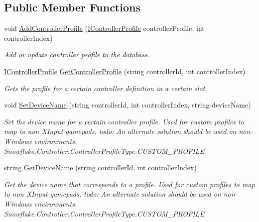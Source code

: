 \subsection*{Public Member Functions}
\begin{DoxyCompactItemize}
\item 
void \hyperlink{interface_snowflake_1_1_controller_1_1_i_controller_profile_database_ac468d872335c4cdbedaffa5e942654ee}{Add\+Controller\+Profile} (\hyperlink{interface_snowflake_1_1_controller_1_1_i_controller_profile}{I\+Controller\+Profile} controller\+Profile, int controller\+Index)
\begin{DoxyCompactList}\small\item\em Add or update controller profile to the database. \end{DoxyCompactList}\item 
\hyperlink{interface_snowflake_1_1_controller_1_1_i_controller_profile}{I\+Controller\+Profile} \hyperlink{interface_snowflake_1_1_controller_1_1_i_controller_profile_database_a1e6de30f211c2de303f9c5944ce01969}{Get\+Controller\+Profile} (string controller\+Id, int controller\+Index)
\begin{DoxyCompactList}\small\item\em Gets the profile for a certain controller definition in a certain slot. \end{DoxyCompactList}\item 
void \hyperlink{interface_snowflake_1_1_controller_1_1_i_controller_profile_database_a00da034510f729461b53d7bce4a1bd4e}{Set\+Device\+Name} (string controller\+Id, int controller\+Index, string device\+Name)
\begin{DoxyCompactList}\small\item\em Set the device name for a certain controller profile. Used for custom profiles to map to non X\+Input gamepads. todo\+: An alternate solution should be used on non-\/\+Windows environments. Snowflake.\+Controller.\+Controller\+Profile\+Type.\+C\+U\+S\+T\+O\+M\+\_\+\+P\+R\+O\+F\+I\+L\+E \end{DoxyCompactList}\item 
string \hyperlink{interface_snowflake_1_1_controller_1_1_i_controller_profile_database_abe919ad0989f8404b347ae1baa1119f3}{Get\+Device\+Name} (string controller\+Id, int controller\+Index)
\begin{DoxyCompactList}\small\item\em Get the device name that corresponds to a profile. Used for custom profiles to map to non X\+Input gamepads. todo\+: An alternate solution should be used on non-\/\+Windows environments. Snowflake.\+Controller.\+Controller\+Profile\+Type.\+C\+U\+S\+T\+O\+M\+\_\+\+P\+R\+O\+F\+I\+L\+E \end{DoxyCompactList}\item 

\end{DoxyCompactItemize}
